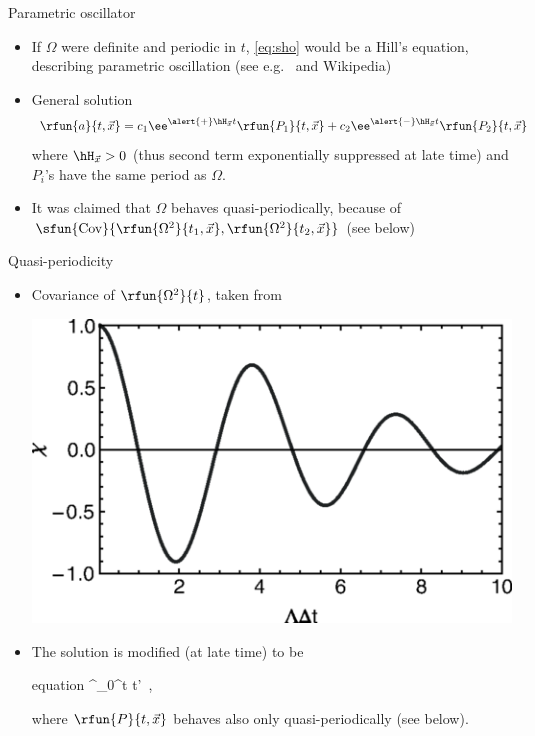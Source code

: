\documentclass{beamer}
\begin{document}
\begin{frame}{Parametric oscillator}
\begin{itemize}
\item If $\Omega$ were definite and periodic in $t$, \cref{eq:sho} would be 
a Hill's equation, describing \alert{parametric oscillation} (see e.g.\ 
\cite[§27]{Landau1976} and Wikipedia)
\item General solution
\begin{equation}
\rfun{a}{t,\vec x} = c_1 \ee^{\alert{+}\hH_{\vec x}t}\rfun{P_1}{t,\vec x}
+ c_2 \ee^{\alert{-}\hH_{\vec x}t}\rfun{P_2}{t,\vec x}
\end{equation}
where $\hH_{\vec x} > 0$ (thus second term exponentially suppressed at late 
time) and $P_i$'s have the same period as $\Omega$.
\item It was claimed that $\Omega$ behaves \alert{quasi-periodically}, because 
of $\sfun{\mathrm{Cov}}{\rfun{\Omega^2}{t_1, \vec x}, 
\rfun{\Omega^2}{t_2, \vec x}}$ (see below)

\end{itemize}


\end{frame}

\begin{frame}{Quasi-periodicity}
\begin{itemize}
\item Covariance of $\rfun{\Omega^2}{t}$, taken from \cite{Wang2017}
\begin{center}
\includegraphics[width=.6\linewidth]{./graphics/FIG.2.png}
\end{center}
\item The solution is modified (at late time) to be
\begin{empheq}[box=\fbox]{equation}
 \approx \ee^{\alert{\int_0^t \dd}t'\, \rfun{\hH_{\vec 
x}}{t'}}
,
\label{eq:approx-a}
\end{empheq}
where $\rfun{P}{t,\vec x}$ behaves also only \alert{quasi-}periodically (see 
below).

\end{itemize}

\end{frame}
\end{document}
